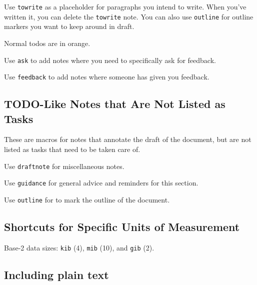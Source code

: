 Use \lstinline{towrite} as a placeholder for paragraphs you intend to write.
When you've written it, you can delete the \lstinline{towrite} note.
You can also use \lstinline{outline} for outline markers you want to keep around in draft.



Normal todos are in orange.

Use \lstinline{ask} to add notes where you need to specifically ask for feedback.

Use \lstinline{feedback} to add notes where someone has given you feedback.



\subsection{TODO-Like Notes that Are Not Listed as Tasks}

These are macros for notes that annotate the draft of the document,
but are not listed as tasks that need to be taken care of.

Use \lstinline{draftnote} for miscellaneous notes.

Use \lstinline{guidance} for general advice and reminders for this section.

Use \lstinline{outline} for to mark the outline of the document.



\subsection{Shortcuts for Specific Units of Measurement}

Base-2 data sizes:
\lstinline{kib} (\SI{4}{\kib}),
\lstinline{mib} (\SI{10}{\mib}),
and
\lstinline{gib} (\SI{2}{\gib}).



\subsection{Including plain text}

